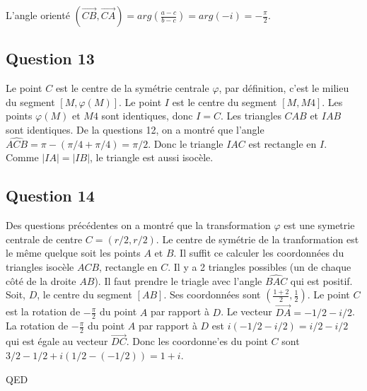 \documentclass[]{book}
\theoremstyle{definition}
\begin{document}
L'angle orient\'e $(\overrightarrow{CB}, \overrightarrow{CA}) = arg(\frac{a-c}{b-c}) = arg(-i) = -\frac{\pi}{2}$.


\subsection*{Question 13}
Le point $C$ est le centre de la sym\'etrie centrale $\varphi$, par d\'efinition, c'est le milieu du segment $[M,\varphi(M)]$. Le point $I$ est le centre du segment $[M, M4]$. Les points $\varphi(M)$ et $M4$ sont identiques, donc $I=C$. Les triangles $CAB$ et $IAB$ sont identiques. De la questions 12, on a montr\'e que l'angle $\widehat{ACB} = \pi - (\pi/4+\pi/4) = \pi/2$. Donc le triangle $IAC$ est rectangle en $I$. Comme $|IA|=|IB|$, le triangle est aussi isoc\`ele. 

\subsection*{Question 14}
Des questions pr\'ec\'edentes on a montr\'e que la transformation $\varphi$ est une symetrie centrale de centre $C = (r/2, r/2)$. Le centre de sym\'etrie de la tranformation est le m\^eme quelque soit les points $A$ et $B$. Il suffit ce calculer les coordonn\'ees du triangles isoc\`ele $ACB$, rectangle en $C$. Il y a 2 triangles possibles (un de chaque c\^ot\'e de la droite $AB$). Il faut prendre le triagle avec l'angle $\widehat{BAC}$ qui est positif.\\

Soit, $D$, le centre du segment $[AB]$. Ses coordonn\'ees sont $(\frac{1+2}{2}, \frac{1}{2})$. Le point $C$ est la rotation de $-\frac{\pi}{2}$ du point $A$ par rapport \`a $D$. Le vecteur $\overrightarrow{DA} = -1/2 -i/2$. La rotation de $-\frac{\pi}{2}$ du point $A$ par rapport \`a $D$ est $i(-1/2 -i/2) = i/2 - i/2$ qui est \'egale au vecteur $\overrightarrow{DC}$. Donc les coordonne'es du point $C$ sont $3/2-1/2+i(1/2-(-1/2)) = 1 + i$.


QED
\end{document}
